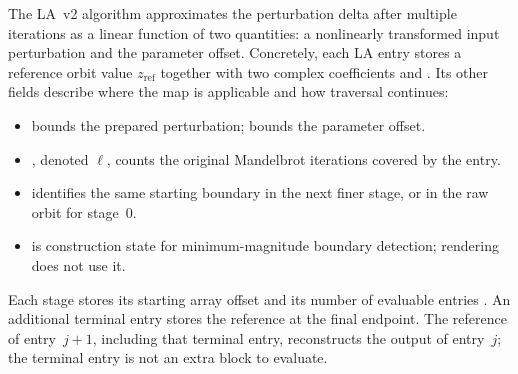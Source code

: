 The LA~v2 algorithm approximates the perturbation delta after multiple
iterations as a linear function of two quantities: a nonlinearly transformed
input perturbation and the parameter offset.  Concretely, each LA entry stores
a reference orbit value \(z_\mathrm{ref}\) together with two complex
coefficients  and . Its other fields describe
where the map is applicable and how traversal continues:
\begin{itemize}
  \item {} bounds the prepared perturbation;
         bounds the parameter offset.
  \item {}, denoted $\ell$, counts the original
        Mandelbrot iterations covered by the entry.
  \item {} identifies the same starting boundary
        in the next finer stage, or in the raw orbit for stage~0.
  \item {} is construction state for minimum-magnitude
        boundary detection; rendering does not use it.
\end{itemize}
Each stage stores its starting array offset  and its
number of evaluable entries . An additional terminal
entry stores the reference at the final endpoint. The reference of
entry~$j+1$, including that terminal entry, reconstructs the output of
entry~$j$; the terminal entry is not an extra block to evaluate.

